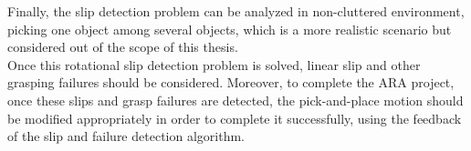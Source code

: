 Finally, the slip detection problem can be analyzed in non-cluttered environment, picking one object among several objects, which is a more realistic scenario but considered out of the scope of this thesis.\\

Once this rotational slip detection problem is solved, linear slip and other grasping failures should be considered. Moreover, to complete the ARA project, once these slips and grasp failures are detected, the pick-and-place motion should be modified appropriately in order to complete it successfully, using the feedback of the slip and failure detection algorithm.


